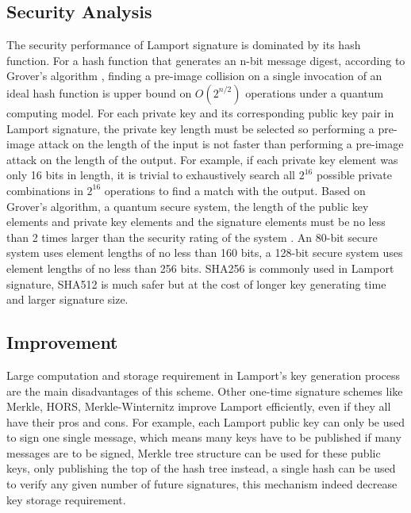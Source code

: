 \documentclass[10pt,sigconf]{acmart}
\begin{document}
\subsection{Security Analysis}

The security performance of Lamport signature is dominated by its hash function. For a hash function that generates an n-bit message digest, according to Grover's algorithm \cite{8463331}, finding a pre-image collision on a single invocation of an ideal hash function is upper bound on $Ο(2^{n/2})$ operations under a quantum computing model. For each private key and its corresponding public key pair in Lamport signature, the private key length must be selected so performing a pre-image attack on the length of the input is not faster than performing a pre-image attack on the length of the output. For example, if each private key element was only 16 bits in length, it is trivial to exhaustively search all $2^{16}$ possible private combinations in $2^{16}$ operations to find a match with the output. Based on Grover's algorithm, a quantum secure system, the length of the public key elements and private key elements and the signature elements must be no less than 2 times larger than the security rating of the system \cite{4897262}. An 80-bit secure system uses element lengths of no less than 160 bits, a 128-bit secure system uses element lengths of no less than 256 bits. SHA256 is commonly used in Lamport signature, SHA512 is much safer but at the cost of longer key generating time and larger signature size. 

\subsection{Improvement}

Large computation and storage requirement in Lamport's key generation process are the main disadvantages of this scheme. Other one-time signature schemes like Merkle, HORS, Merkle-Winternitz improve Lamport efficiently, even if they all have their pros and cons. For example, each Lamport public key can only be used to sign one single message, which means many keys have to be published if many messages are to be signed, Merkle tree structure can be used for these public keys, only publishing the top of the hash tree instead, a single hash can be used to verify any given number of future signatures, this mechanism indeed decrease key storage requirement.




\end{document}
